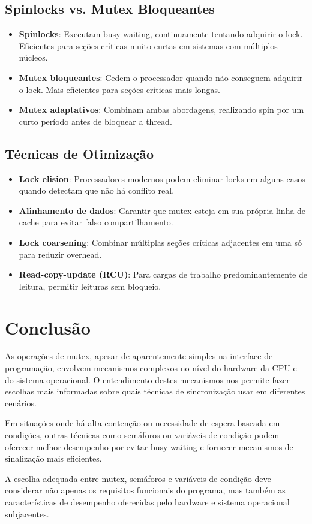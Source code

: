 \documentclass[12pt]{article}
\begin{document}
\subsection{Spinlocks vs. Mutex Bloqueantes}

\begin{itemize}
    \item \textbf{Spinlocks}: Executam busy waiting, continuamente tentando adquirir o lock. Eficientes para seções críticas muito curtas em sistemas com múltiplos núcleos.
    \item \textbf{Mutex bloqueantes}: Cedem o processador quando não conseguem adquirir o lock. Mais eficientes para seções críticas mais longas.
    \item \textbf{Mutex adaptativos}: Combinam ambas abordagens, realizando spin por um curto período antes de bloquear a thread.
\end{itemize}

\subsection{Técnicas de Otimização}

\begin{itemize}
    \item \textbf{Lock elision}: Processadores modernos podem eliminar locks em alguns casos quando detectam que não há conflito real.
    \item \textbf{Alinhamento de dados}: Garantir que mutex esteja em sua própria linha de cache para evitar falso compartilhamento.
    \item \textbf{Lock coarsening}: Combinar múltiplas seções críticas adjacentes em uma só para reduzir overhead.
    \item \textbf{Read-copy-update (RCU)}: Para cargas de trabalho predominantemente de leitura, permitir leituras sem bloqueio.
\end{itemize}

\section{Conclusão}

As operações de mutex, apesar de aparentemente simples na interface de programação, envolvem mecanismos complexos no nível do hardware da CPU e do sistema operacional. O entendimento destes mecanismos nos permite fazer escolhas mais informadas sobre quais técnicas de sincronização usar em diferentes cenários.

Em situações onde há alta contenção ou necessidade de espera baseada em condições, outras técnicas como semáforos ou variáveis de condição podem oferecer melhor desempenho por evitar busy waiting e fornecer mecanismos de sinalização mais eficientes.

A escolha adequada entre mutex, semáforos e variáveis de condição deve considerar não apenas os requisitos funcionais do programa, mas também as características de desempenho oferecidas pelo hardware e sistema operacional subjacentes.
\end{document}
